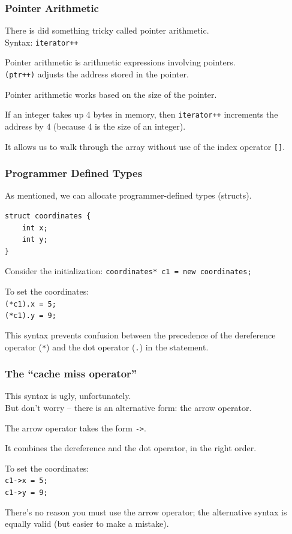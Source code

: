 \begin{frame}
\frametitle{Pointer Arithmetic}

There is did something tricky called \alert{pointer arithmetic}.\\
\quad Syntax: \texttt{iterator++}

Pointer arithmetic is arithmetic expressions involving pointers.\\
\quad \texttt{(ptr++)} adjusts the address stored in the pointer.

Pointer arithmetic works based on the size of the pointer.

If an integer takes up 4 bytes in memory, then \texttt{iterator++} increments the address by 4 (because 4 is the size of an integer).

It allows us to walk through the array without use of the index operator \texttt{[]}.

\end{frame}




\begin{frame}[fragile]
\frametitle{Programmer Defined Types}

As mentioned, we can allocate programmer-defined types (structs). 

\begin{verbatim}
struct coordinates {
    int x;
    int y;
}
\end{verbatim}

Consider the initialization: \texttt{coordinates* c1 = new coordinates;}


To set the coordinates:\\
\quad \texttt{(*c1).x = 5;\\
\quad (*c1).y = 9;}

This syntax prevents confusion between the precedence of the dereference operator (\texttt{*}) and the dot operator (\texttt{.}) in the statement.

\end{frame}



\begin{frame}
\frametitle{The ``cache miss operator''}

This syntax is ugly, unfortunately.\\
\quad But don't worry -- there is an alternative form: the arrow operator.

The arrow operator takes the form \texttt{->}.

It combines the dereference and the dot operator, in the right order.

To set the coordinates:\\
\quad \texttt{c1->x = 5;\\
\quad c1->y = 9;}

There's no reason you must use the arrow operator; the alternative syntax is equally valid (but easier to make a mistake).

\end{frame}


